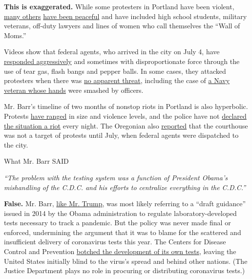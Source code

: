 \textbf{This is exaggerated.} While some protesters in Portland have
been violent,
\href{https://www.nytimes3xbfgragh.onion/2020/07/19/us/portland-protests.html}{many
others}
\href{https://www.nytimes3xbfgragh.onion/2020/07/27/us/protests-divisions-blm.html}{have
been peaceful} and have included high school students, military
veterans, off-duty lawyers and lines of women who call themselves the
``Wall of Moms.''

Videos show that federal agents, who arrived in the city on July 4, have
\href{https://www.nytimes3xbfgragh.onion/2020/07/21/us/portland-protests.html}{responded
aggressively} and sometimes with disproportionate force through the use
of tear gas, flash bangs and pepper balls. In some cases, they attacked
protesters when there was
\href{https://www.nytimes3xbfgragh.onion/video/us/100000007243995/portland-protests-federal-government.html?action=click\&gtype=vhs\&version=vhs-heading\&module=vhs\&region=title-area\&cview=true\&t=4}{no
apparent threat}, including the case of
\href{https://www.nytimes3xbfgragh.onion/2020/07/20/us/portland-protests-navy-christopher-david.html}{a
Navy veteran whose hands} were smashed by officers.

Mr. Barr's timeline of two months of nonstop riots in Portland is also
hyperbolic. Protests
\href{https://pamplinmedia.com/pt/9-news/474579-383427-a-timeline-of-the-portland-protests-and-police-clashes}{have
ranged} in size and violence levels, and the police have not
\href{https://twitter.com/search?q=riot\%20from\%3A\%40PortlandPolice\&src=typed_query\&f=live}{declared
the situation a riot} every night. The Oregonian also
\href{https://www.oregonlive.com/politics/2020/07/fact-checking-barrs-testimony-before-congress-on-portland-protests.html}{reported}
that the courthouse was not a target of protests until July, when
federal agents were dispatched to the city.

What Mr. Barr SAID

\emph{``The problem with the testing system was a function of President
Obama's mishandling of the C.D.C. and his efforts to centralize
everything in the C.D.C.''}

\textbf{False.} Mr. Barr,
\href{https://www.nytimes3xbfgragh.onion/2020/03/13/us/politics/fact-check-trump-coronavirus.html}{like
Mr. Trump}, was most likely referring to a ``draft guidance'' issued in
2014 by the Obama administration to regulate laboratory-developed tests
necessary to track a pandemic. But the policy was never made final or
enforced, undermining the argument that it was to blame for the
scattered and insufficient delivery of coronavirus tests this year. The
Centers for Disease Control and Prevention
\href{https://www.nytimes3xbfgragh.onion/2020/03/28/us/testing-coronavirus-pandemic.html}{botched
the development of its own tests}, leaving the United States initially
blind to the virus's spread and behind other nations. (The Justice
Department plays no role in procuring or distributing coronavirus
tests.)

